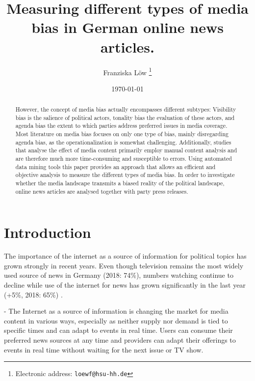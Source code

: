 \documentclass[12pt,a4paper,notitlepage]{article}
\title{Measuring different types of media bias in German online news articles.}
\date{\today}
\author{Franziska Löw
  \thanks{Electronic address: \texttt{loewf@hsu-hh.de}}}
\affil{Department of Industrial Economics,\\ Helmut Schmidt University,\\ Hamburg, Germany}
\begin{document}
\begin{titlepage}
	\maketitle
	\begin{abstract}
	However, the concept of media bias actually encompasses different subtypes: Visibility bias is the salience of political actors, tonality bias the evaluation of these actors, and agenda bias the extent to which parties address preferred issues in media coverage. Most literature on media bias focuses on only one type of bias, mainly disregarding agenda bias, as the operationalization is somewhat challenging. Additionally, studies that analyse the effect of media content primarily employ manual content analysis and are therefore much more time-consuming and susceptible to errors. Using automated data mining tools this paper provides an approach that allows an efficient and objective analysis to measure the different types of media bias. In order to investigate whether the media landscape transmits a biased reality of the political landscape, online news articles are analysed together with party press releases.
	\end{abstract}

\end{titlepage}

\tableofcontents

\pagebreak


\section{Introduction}

The importance of the internet as a source of information for political topics has grown strongly in recent years. Even though television remains the most widely used source of news in Germany (2018: 74\%), numbers watching continue to decline while use of the internet for news has grown significantly in the last year (+5\%, 2018: 65\%) \citep{holig_reuters_2018}. 

- The Internet as a source of information is changing the market for media content in various ways, especially as neither supply nor demand is tied to specific times and can adapt to events in real time. Users can consume their preferred news sources at any time and providers can adapt their offerings to events in real time without waiting for the next issue or TV show.
\end{document}
